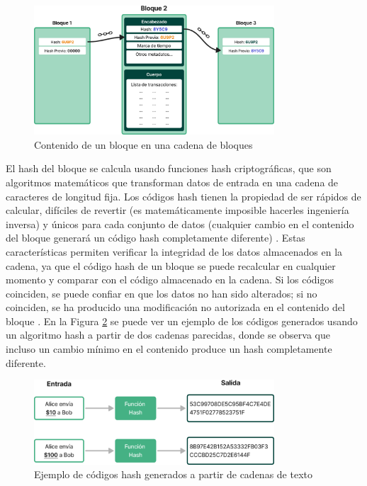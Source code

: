 \begin{figure}[!b]
    \centering
    \includegraphics[width=0.8\textwidth]{Figures/block-structure.png}
    \caption{Contenido de un bloque en una cadena de bloques}
    \label{fig:block-structure}
\end{figure}

El hash del bloque se calcula usando funciones hash criptográficas, que son algoritmos matemáticos que transforman datos de entrada en una cadena de caracteres de longitud fija. Los códigos hash tienen la propiedad de ser rápidos de calcular, difíciles de revertir (es matemáticamente imposible hacerles ingeniería inversa) y únicos para cada conjunto de datos (cualquier cambio en el contenido del bloque generará un código hash completamente diferente) \cite{pending}. Estas características permiten verificar la integridad de los datos almacenados en la cadena, ya que el código hash de un bloque se puede recalcular en cualquier momento y comparar con el código almacenado en la cadena. Si los códigos coinciden, se puede confiar en que los datos no han sido alterados; si no coinciden, se ha producido una modificación no autorizada en el contenido del bloque \cite{pending}. En la Figura \ref{fig:hash-example} se puede ver un ejemplo de los códigos generados usando un algoritmo hash a partir de dos cadenas parecidas, donde se observa que incluso un cambio mínimo en el contenido produce un hash completamente diferente. 

\begin{figure}[!tb]
    \centering
    \includegraphics[width=0.8\textwidth]{Figures/hash-example.png}
    \caption{Ejemplo de códigos hash generados a partir de cadenas de texto}
    \label{fig:hash-example}
\end{figure}

